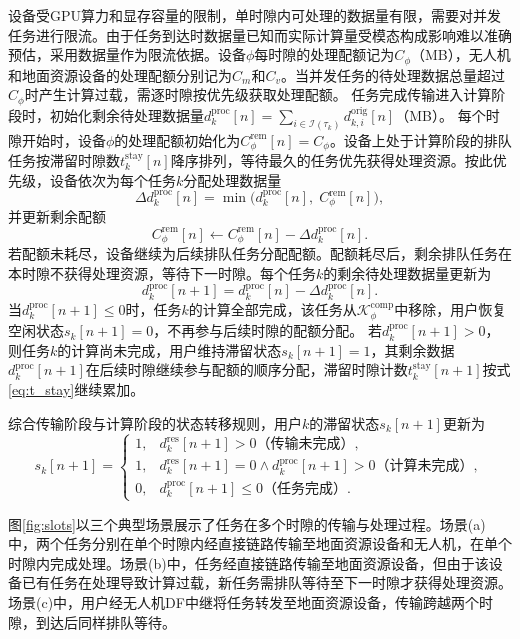 设备受GPU算力和显存容量的限制，单时隙内可处理的数据量有限，需要对并发任务进行限流。由于任务到达时数据量已知而实际计算量受模态构成影响难以准确预估，采用数据量作为限流依据。设备$\phi$每时隙的处理配额记为$C_\phi$（MB），无人机和地面资源设备的处理配额分别记为$C_m$和$C_v$。当并发任务的待处理数据总量超过$C_\phi$时产生计算过载，需逐时隙按优先级获取处理配额。
任务完成传输进入计算阶段时，初始化剩余待处理数据量$d_k^{\text{proc}}[n] = \sum_{i\in\mathcal{I}(\tau_k)} d_{k,i}^{\text{orig}}[n]$（MB）。
每个时隙开始时，设备$\phi$的处理配额初始化为$C_\phi^{\text{rem}}[n]=C_\phi$。设备上处于计算阶段的排队任务按滞留时隙数$t_k^{\text{stay}}[n]$降序排列，等待最久的任务优先获得处理资源。按此优先级，设备依次为每个任务$k$分配处理数据量
\begin{equation}
\Delta d_k^{\text{proc}}[n] = \min\!\big(d_k^{\text{proc}}[n],\; C_\phi^{\text{rem}}[n]\big),
\end{equation}
并更新剩余配额
\begin{equation}
C_\phi^{\text{rem}}[n] \leftarrow C_\phi^{\text{rem}}[n] - \Delta d_k^{\text{proc}}[n].
\end{equation}
若配额未耗尽，设备继续为后续排队任务分配配额。配额耗尽后，剩余排队任务在本时隙不获得处理资源，等待下一时隙。每个任务$k$的剩余待处理数据量更新为
\begin{equation}
d_k^{\text{proc}}[n+1] = d_k^{\text{proc}}[n] - \Delta d_k^{\text{proc}}[n].
\end{equation}
当$d_k^{\text{proc}}[n+1] \leq 0$时，任务$k$的计算全部完成，该任务从$\mathcal{K}_\phi^{\text{comp}}$中移除，用户恢复空闲状态$s_k[n+1]=0$，不再参与后续时隙的配额分配。
若$d_k^{\text{proc}}[n+1] > 0$，则任务$k$的计算尚未完成，用户维持滞留状态$s_k[n+1]=1$，其剩余数据$d_k^{\text{proc}}[n+1]$在后续时隙继续参与配额的顺序分配，滞留时隙计数$t_k^{\text{stay}}[n+1]$按式\eqref{eq:t_stay}继续累加。

综合传输阶段与计算阶段的状态转移规则，用户$k$的滞留状态$s_k[n+1]$更新为
\begin{equation}\label{eq:s_k}
s_k[n+1] =
\begin{cases}
1, & d_k^{\text{res}}[n+1] > 0 \text{（传输未完成）},\\
1, & d_k^{\text{res}}[n+1] = 0 \wedge d_k^{\text{proc}}[n+1] > 0 \text{（计算未完成）},\\
0, & d_k^{\text{proc}}[n+1] \leq 0 \text{（任务完成）}.
\end{cases}
\end{equation}

图\ref{fig:slots}以三个典型场景展示了任务在多个时隙的传输与处理过程。场景(a)中，两个任务分别在单个时隙内经直接链路传输至地面资源设备和无人机，在单个时隙内完成处理。场景(b)中，任务经直接链路传输至地面资源设备，但由于该设备已有任务在处理导致计算过载，新任务需排队等待至下一时隙才获得处理资源。场景(c)中，用户经无人机DF中继将任务转发至地面资源设备，传输跨越两个时隙，到达后同样排队等待。

